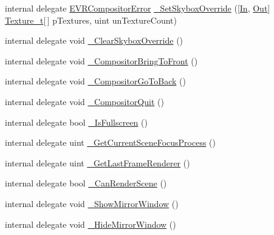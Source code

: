 \begin{DoxyCompactItemize}
\item 
internal delegate \mbox{\hyperlink{namespace_valve_1_1_v_r_ac34ee1034fda668ccd45f57676ded81b}{E\+V\+R\+Compositor\+Error}} \mbox{\hyperlink{struct_valve_1_1_v_r_1_1_i_v_r_compositor_a6d4862a15d14c6786ea787b59a6d08c1}{\+\_\+\+Set\+Skybox\+Override}} (\mbox{[}\mbox{\hyperlink{namespace_valve_1_1_v_r_a1e6192cb5ddaf204afab87ccb5728780aefeb369cccbd560588a756610865664c}{In}}, \mbox{\hyperlink{namespace_valve_1_1_v_r_a1e6192cb5ddaf204afab87ccb5728780a7c147cda9e49590f6abe83d118b7353b}{Out}}\mbox{]} \mbox{\hyperlink{struct_valve_1_1_v_r_1_1_texture__t}{Texture\+\_\+t}}\mbox{[}$\,$\mbox{]} p\+Textures, uint un\+Texture\+Count)
\item 
internal delegate void \mbox{\hyperlink{struct_valve_1_1_v_r_1_1_i_v_r_compositor_aed1353bac615b802be6754380e30fbf1}{\+\_\+\+Clear\+Skybox\+Override}} ()
\item 
internal delegate void \mbox{\hyperlink{struct_valve_1_1_v_r_1_1_i_v_r_compositor_a0a02f8e41398d3129dea3bf9ba3a8a25}{\+\_\+\+Compositor\+Bring\+To\+Front}} ()
\item 
internal delegate void \mbox{\hyperlink{struct_valve_1_1_v_r_1_1_i_v_r_compositor_ad0df5d7509e71103e962c8b331d6cfd5}{\+\_\+\+Compositor\+Go\+To\+Back}} ()
\item 
internal delegate void \mbox{\hyperlink{struct_valve_1_1_v_r_1_1_i_v_r_compositor_a06ecd250e5b6b1b461d10582eb94e16c}{\+\_\+\+Compositor\+Quit}} ()
\item 
internal delegate bool \mbox{\hyperlink{struct_valve_1_1_v_r_1_1_i_v_r_compositor_a860925c25ba19ea99a70ab8b080fc57e}{\+\_\+\+Is\+Fullscreen}} ()
\item 
internal delegate uint \mbox{\hyperlink{struct_valve_1_1_v_r_1_1_i_v_r_compositor_a5ae9bface8b9a771d2d7240a2b425a7e}{\+\_\+\+Get\+Current\+Scene\+Focus\+Process}} ()
\item 
internal delegate uint \mbox{\hyperlink{struct_valve_1_1_v_r_1_1_i_v_r_compositor_a907be4acb4579b5ee85ba1c6b455f1ea}{\+\_\+\+Get\+Last\+Frame\+Renderer}} ()
\item 
internal delegate bool \mbox{\hyperlink{struct_valve_1_1_v_r_1_1_i_v_r_compositor_a9987f397d90497cfb7dec1feeeab53e4}{\+\_\+\+Can\+Render\+Scene}} ()
\item 
internal delegate void \mbox{\hyperlink{struct_valve_1_1_v_r_1_1_i_v_r_compositor_a752ed27fd9773cc53b3be5e0d7cd2556}{\+\_\+\+Show\+Mirror\+Window}} ()
\item 
internal delegate void \mbox{\hyperlink{struct_valve_1_1_v_r_1_1_i_v_r_compositor_ae7894fcd457855bc576170f3ef45a658}{\+\_\+\+Hide\+Mirror\+Window}} ()

\end{DoxyCompactItemize}
